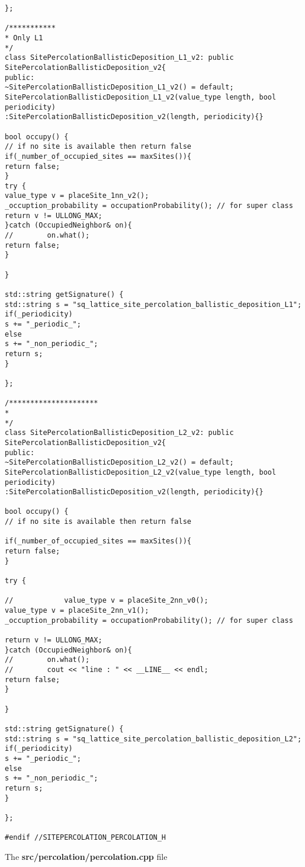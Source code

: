 \begin{lstlisting}[style=CStyle]
};

/***********
* Only L1
*/
class SitePercolationBallisticDeposition_L1_v2: public SitePercolationBallisticDeposition_v2{
public:
~SitePercolationBallisticDeposition_L1_v2() = default;
SitePercolationBallisticDeposition_L1_v2(value_type length, bool periodicity)
:SitePercolationBallisticDeposition_v2(length, periodicity){}

bool occupy() {
// if no site is available then return false
if(_number_of_occupied_sites == maxSites()){
return false;
}
try {
value_type v = placeSite_1nn_v2();
_occuption_probability = occupationProbability(); // for super class
return v != ULLONG_MAX;
}catch (OccupiedNeighbor& on){
//        on.what();
return false;
}

}

std::string getSignature() {
std::string s = "sq_lattice_site_percolation_ballistic_deposition_L1";
if(_periodicity)
s += "_periodic_";
else
s += "_non_periodic_";
return s;
}

};

/*********************
*
*/
class SitePercolationBallisticDeposition_L2_v2: public SitePercolationBallisticDeposition_v2{
public:
~SitePercolationBallisticDeposition_L2_v2() = default;
SitePercolationBallisticDeposition_L2_v2(value_type length, bool periodicity)
:SitePercolationBallisticDeposition_v2(length, periodicity){}

bool occupy() {
// if no site is available then return false

if(_number_of_occupied_sites == maxSites()){
return false;
}

try {

//            value_type v = placeSite_2nn_v0();
value_type v = placeSite_2nn_v1();
_occuption_probability = occupationProbability(); // for super class

return v != ULLONG_MAX;
}catch (OccupiedNeighbor& on){
//        on.what();
//        cout << "line : " << __LINE__ << endl;
return false;
}

}

std::string getSignature() {
std::string s = "sq_lattice_site_percolation_ballistic_deposition_L2";
if(_periodicity)
s += "_periodic_";
else
s += "_non_periodic_";
return s;
}

};

#endif //SITEPERCOLATION_PERCOLATION_H
\end{lstlisting}

The \textbf{src/percolation/percolation.cpp} file

